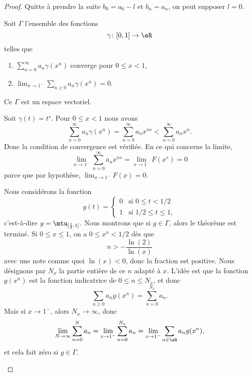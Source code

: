 \begin{proof}
	Quitte à prendre la suite \( b_0=a_0-l\) et \( b_n=a_n\), on peut supposer \( l=0\).

	Soit \( \Gamma\) l'ensemble des fonctions
	\begin{equation}
		\gamma\colon \mathopen[ 0 , 1 \mathclose]\to \eR
	\end{equation}
	telles que
	\begin{enumerate}
		\item
		      \( \sum_{n=0}^{\infty}a_n\gamma(x^n)\) converge pour \( 0\leq x<1\),
		\item
		      \( \lim_{x\to 1^-} \sum_{n\geq 0}a_n\gamma(x^n)=0\).
	\end{enumerate}
	Ce \( \Gamma\) est un espace vectoriel.
	\begin{subproof}
		Soit \( \gamma(t)=t^s\). Pour \( 0\leq x<1\) nous avons
		\begin{equation}
			\sum_{n=0}^{\infty}a_n\gamma(x^n)=\sum_{n=0}^{\infty}a_nx^{ns}<\sum_{n=0}^{\infty}a_nx^n.
		\end{equation}
		Donc la condition de convergence est vérifiée. En ce qui concerne la limite,
		\begin{equation}
			\lim_{x\to 1^-} \sum_{n=0}^{\infty}a_nx^{ns}=\lim_{x\to 1^-} F(x^s)=0
		\end{equation}
		parce que par hypothèse, \( \lim_{x\to 1^-} F(x)=0\).

		Nous considérons la fonction
		\begin{equation}
			g(t)=\begin{cases}
				0 & \text{si } 0\leq t<1/2      \\
				1 & \text{si } 1/2\leq t\leq 1,
			\end{cases}
		\end{equation}
		c'est-à-dire \( g=\mtu_{\mathopen[ \frac{ 1 }{2} , 1 \mathclose]}\). Nous montrons que si \( g\in \Gamma\), alors le théorème est terminé. Si \( 0\leq x\leq 1\), on a \( 0\leq x^n<1/2\) dès que
		\begin{equation}
			n>-\frac{ \ln(2) }{ \ln(x) }
		\end{equation}
		avec une note comme quoi \( \ln(x)<0\), donc la fraction est positive. Nous désignons par \( N_x\) la partie entière de ce \( n\) adapté à \( x\). L'idée est que la fonction  \( g(x^n)\) est la fonction indicatrice de \(0 \leq n\leq N_x\), et donc
		\begin{equation}
			\sum_{n\geq 0}a_ng(x^n)=\sum_{n=0}^{N_x}a_n.
		\end{equation}
		Mais si \( x\to 1^-\), alors \( N_x\to \infty\), donc
		\begin{equation}
			\lim_{N\to \infty} \sum_{n=0}^Na_n=\lim_{x\to 1^-} \sum_{n=0}^{N_x}a_n=\lim_{x\to 1^-} \sum_{n\in \eN}a_ng(x^n),
		\end{equation}
		et cela fait zéro si \( g\in \Gamma\).


\end{subproof}
\end{proof}
